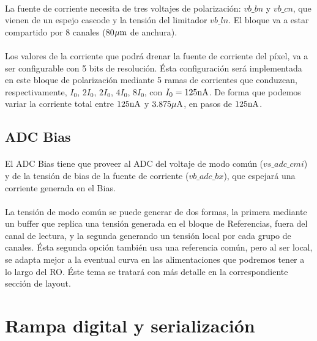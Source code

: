 \paragraph{}
La fuente de corriente necesita de tres voltajes de polarización: $vb\_bn$ y
$vb\_cn$, que vienen de un espejo cascode y la tensión del limitador $vb\_ln$.
El bloque va a estar compartido por 8 canales (80$\mu\text{m}$ de anchura).

\paragraph{}
Los valores de la corriente que podrá drenar la fuente de corriente del píxel, va
a ser configurable con 5 bits de resolución. Ésta configuración será implementada
en este bloque de polarización mediante 5 ramas de corrientes que conduzcan,
respectivamente, $I_0$, $2I_0$, $2I_0$, $4I_0$, $8I_0$, con
$I_0=125\text{nA}$. De forma que podemos variar la corriente total entre $125\text{nA}$ y
$3.875\mu\text{A}$, en pasos de $125\text{nA}$.

\subsection{ADC Bias}

\paragraph{}
El ADC Bias tiene que proveer al ADC del voltaje de modo común ($vs\_adc\_cmi$) y
de la tensión de bias de la fuente de corriente ($vb\_adc\_bx$), que espejará
una corriente generada en el Bias.

\paragraph{}
La tensión de modo común se puede generar de dos formas, la primera mediante un
buffer que replica una tensión generada en el bloque de Referencias, fuera del
canal de lectura, y la segunda generando un tensión local por cada grupo de canales.
Ésta segunda opción también usa una referencia común, pero al ser local, se adapta
mejor a la eventual curva en las alimentaciones que podremos tener a lo largo
del RO. Éste tema se tratará con más detalle en la correspondiente sección de layout.


\section{Rampa digital y serialización}

